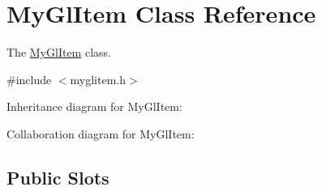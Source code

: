 \hypertarget{class_my_gl_item}{}\section{My\+Gl\+Item Class Reference}
\label{class_my_gl_item}


The \mbox{\hyperlink{class_my_gl_item}{My\+Gl\+Item}} class.  




{\ttfamily \#include $<$myglitem.\+h$>$}



Inheritance diagram for My\+Gl\+Item\+:


Collaboration diagram for My\+Gl\+Item\+:
\subsection*{Public Slots}
